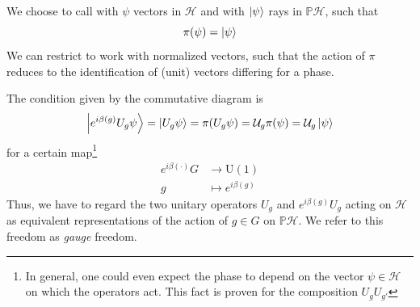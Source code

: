 \documentclass[11pt]{article}
\theoremstyle{definition}
\numberwithin{equation}{section}
\newcommand*\cH{\mathcal{H}}
\newcommand*\cU{\mathcal{U}}
\newcommand*\bbP{\mathbb{P}}
\newcommand*\U{\mathrm{U}}
\begin{document}
We choose to call with $\psi$ vectors in $\cH$ and with $\ket{\psi}$ rays in $\bbP \cH$, such that
\begin{equation}
    \pi ( \psi) = \ket{\psi}
\end{equation}
We can restrict to work with normalized vectors, such that the action of $\pi$ reduces to the identification of (unit) vectors differing for a phase.
 
The condition given by the commutative diagram is
\begin{equation}
	\ket{ e^{i \beta(g)} U_g \psi } = \ket{U_{g} \psi} = \pi ( U_g \psi )  = \cU_g \pi (\psi) =   \cU_g  \ket{\psi} 
\end{equation}
for a certain map\footnote{In general, one could even expect the phase to depend on the vector $\psi \in \cH$ on which the operators act. This fact is proven for the composition $U_g U_{g'}$ }
\begin{equation}
    \begin{aligned}
        e^{i \beta(\cdot)}  G &\to \U(1)\\
        g &\mapsto e^{i \beta(g)}
    \end{aligned}
\end{equation}
Thus, we have to regard the two unitary operators $U_g$ and $e^{i \beta(g)} U_g$ acting on $\cH$ as equivalent representations of the action of $g \in G$ on $\bbP\cH$. We refer to this freedom as \textit{gauge} freedom. 
\end{document}
